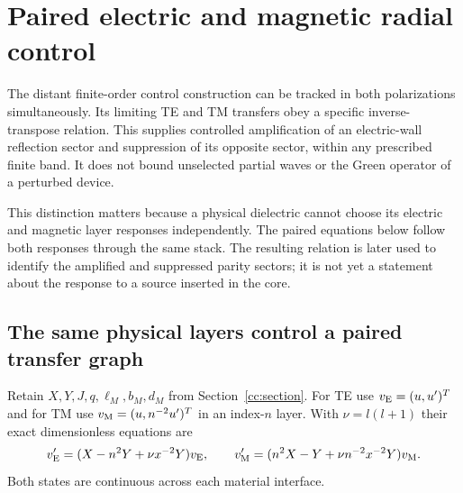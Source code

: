 \section{Paired electric and magnetic radial control}
\label{cd:section}

The distant finite-order control construction can be tracked in both
polarizations simultaneously. Its limiting TE and TM transfers obey a
specific inverse-transpose relation. This supplies controlled amplification
of an electric-wall reflection sector and suppression of its opposite
sector, within any prescribed finite band. It does not bound unselected
partial waves or the Green operator of a perturbed device.

This distinction matters because a physical dielectric cannot choose its
electric and magnetic layer responses independently. The paired equations
below follow both responses through the same stack. The resulting relation
is later used to identify the amplified and suppressed parity sectors; it
is not yet a statement about the response to a source inserted in the core.

\subsection{The same physical layers control a paired transfer graph}

Retain $X,Y,J,q,\ell_M,b_M,d_M$ from Section~\ref{cc:section}.
For TE use $v_{\rm E}=(u,u')^T$ and for TM use
$v_{\rm M}=(u,n^{-2}u')^T$ in an index-$n$ layer. With
$\nu=l(l+1)$ their exact dimensionless equations are
\begin{equation}\label{cd:generators}
 v_{\rm E}'=(X-n^2Y+\nu x^{-2}Y)v_{\rm E},\qquad
 v_{\rm M}'=(n^2X-Y+\nu n^{-2}x^{-2}Y)v_{\rm M}.
\end{equation}
Both states are continuous across each material interface.

